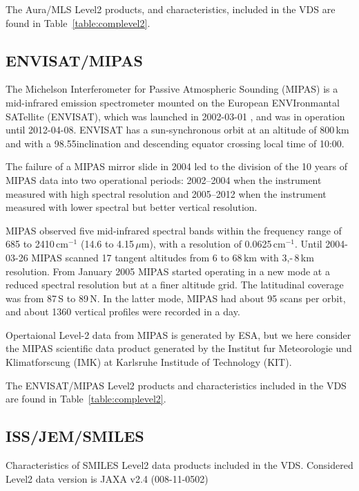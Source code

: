 The Aura/MLS Level2 products, and characteristics, included in the
VDS are found in Table~\ref{table:complevel2}.



\subsection{ENVISAT/MIPAS}


The Michelson Interferometer for Passive Atmospheric
Sounding (MIPAS) is a mid-infrared emission spectrometer
mounted on the European ENVIronmantal SATellite (ENVISAT),
which was launched in 2002-03-01 \citep{fischer2008},
and was in operation until 2012-04-08. 
ENVISAT has a sun-synchronous orbit at an altitude of 800\,km
and with a 98.55\degree inclination and descending equator 
crossing local time of 10:00.

The failure of a MIPAS mirror slide in 2004 led to the 
division of the 10 years of MIPAS
data into two operational periods: 2002--2004 when the 
instrument measured with high spectral resolution 
and 2005--2012 when the instrument measured with lower 
spectral but better vertical resolution.

MIPAS observed five mid-infrared spectral bands within the
frequency range of 685 to 2410\,cm\(^{-1}\) (14.6 to 4.15\,\(\mu\)m),
with a resolution of 0.0625\,cm\(^{-1}\).
Until 2004-03-26 MIPAS scanned 17 tangent altitudes from 
6 to 68\,km with 3,-\,8\,km resolution.
From January 2005 MIPAS started operating in a new mode
at a reduced spectral resolution but at a finer altitude
grid. The latitudinal coverage was from 87\degree\,S to 89\degree\,N.
In the latter mode, MIPAS had about 95 scans per orbit, and about
1360 vertical profiles were recorded in a day.

Opertaional Level-2 data from MIPAS is generated by ESA,
but we here consider the MIPAS scientific data product
generated by the Institut fur Meteorologie und Klimatforscung
(IMK) at Karlsruhe Institude of Technology (KIT).

The  ENVISAT/MIPAS Level2 products and characteristics included in the
VDS are found in Table~\ref{table:complevel2}.




\subsection{ISS/JEM/SMILES}

Characteristics of SMILES Level2 data products included in the VDS.
Considered Level2 data version is JAXA v2.4 (008-11-0502)


